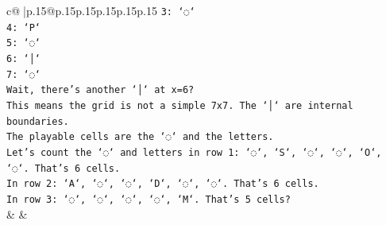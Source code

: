 \documentclass{article}
\begin{document}
{\begin{supertabular}{c@{$\;$}|p{.15\linewidth}@{}p{.15\linewidth}p{.15\linewidth}p{.15\linewidth}p{.15\linewidth}p{.15\linewidth}}
{{{\texttt{3: `◌`} \\
\texttt{4: `P`} \\
\texttt{5: `◌`} \\
\texttt{6: `│`} \\
\texttt{7: `◌`} \\
\texttt{Wait, there's another `│` at x=6?} \\
\texttt{This means the grid is not a simple 7x7. The `│` are internal boundaries.} \\
\texttt{The playable cells are the `◌` and the letters.} \\
\texttt{Let's count the `◌` and letters in row 1: `◌`, `S`, `◌`, `◌`, `O`, `◌`. That's 6 cells.} \\
\texttt{In row 2: `A`, `◌`, `◌`, `D`, `◌`, `◌`. That's 6 cells.} \\
\texttt{In row 3: `◌`, `◌`, `◌`, `◌`, `M`. That's 5 cells?} \\
            }
        }
    }
    & & \\ \\


\end{supertabular}}
\end{document}
